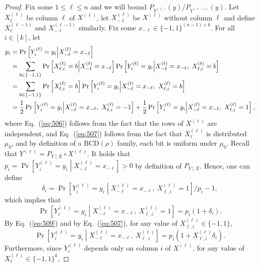 \documentclass[final, 12pt]{colt2018}
\providecommand{\BCD}{\mathrm{BCD}}
\renewcommand{\eqref}[1]{Eq.~(\ref{#1})}
\begin{document}
\begin{proof}
Fix some $1 \le \ell \le n$ and we will bound $P_{Y^{(\ell)}}(y) / P_{Y^{(\ell-1)}}(y)$. Let $X^{(\ell)}_\ell$ be column $\ell$ of $X^{(\ell)}$, let $X_{-\ell}^{(\ell)}$ be $X^{(\ell)}$ without column $\ell$ and define $X^{(\ell-1)}_\ell$ and $X^{(\ell-1)}_{-\ell}$ similarly. 
Fix some $x_{-\ell} \in \{-1,1\}^{(n-1) \times k}$. For all $i \in [k]$, let 
\begin{align}
p_i 
&= \Pr\left[Y^{(\ell)}_i = y_i \middle| X^{(\ell)}_{-\ell} = x_{-\ell}\right] \notag \\
&= \sum_{b\in\{-1,1\}} \Pr\left[X^{(\ell)}_{\ell,i} = b \middle| X^{(\ell)}_{-\ell} = x_{-\ell} \right] 
\Pr\left[Y^{(\ell)}_i = y_i \middle| X^{(\ell)}_{-\ell} = x_{-\ell},\ X^{(\ell)}_{\ell,i} = b \right] \notag \\
&= \sum_{b\in\{-1,1\}} \Pr\left[X^{(\ell)}_{\ell,i} = b \right] 
\Pr\left[Y^{(\ell)}_i = y_i \middle| X^{(\ell)}_{-\ell} = x_{-\ell},\ X^{(\ell)}_{\ell,i} = b \right] \label{eq:506} \\
&= \frac{1}{2} \Pr\left[Y^{(\ell)}_i = y_i \middle| X^{(\ell)}_{-\ell} = x_{-\ell},\ X^{(\ell)}_{\ell,i} = -1 \right]
+ \frac{1}{2} \Pr\left[Y^{(\ell)}_i = y_i \middle| X^{(\ell)}_{-\ell} = x_{-\ell},\ X^{(\ell)}_{\ell,i} = 1 \right], \label{eq:507}
\end{align}
where \eqref{eq:506} follows from the fact that the rows of $X^{(\ell)}$ are independent, and \eqref{eq:507} follows from the fact that $X^{(\ell)}_\ell$ is distributed $\mu_0$, and by definition of a $\BCD(\rho)$ family, each bit is uniform under $\mu_0$. Recall that $Y^{(\ell)} = P_{Y\mid X} \circ X^{(\ell)}$. It holds that $p_i = \Pr\left[Y^{(\ell)}_i = y_i \middle| X^{(\ell)}_{-\ell} = x_{-\ell}\right]>0$ by definition of $P_{Y\mid X}$. Hence, one can define
\[ \delta_i = \Pr\left[Y^{(\ell)}_i = y_i \middle| X^{(\ell)}_{-\ell} = x_{-\ell},\ X^{(\ell)}_{\ell,i} = 1 \right] / p_i - 1, \]
which implies that
\begin{equation} \label{eq:509}
\Pr\left[Y^{(\ell)}_i = y_i \middle| X^{(\ell)}_{-\ell} = x_{-\ell},\ X^{(\ell)}_{\ell,i} = 1 \right]
= p_i\left(1 + \delta_i \right).
\end{equation}
By \eqref{eq:509} and by \eqref{eq:507}, for any value of $X^{(\ell)}_{\ell,i} \in \{-1,1\}$,
\begin{equation} \label{eq:510}
\Pr\left[Y^{(\ell)}_i = y_i \middle| X^{(\ell)}_{-\ell} = x_{-\ell},\ X^{(\ell)}_{\ell,i} \right]
= p_i\left(1 + X_{\ell,i}^{(\ell)} \delta_i \right).
\end{equation}
Furthermore, since $Y^{(\ell)}_i$ depends only on column $i$ of $X^{(\ell)}$, for any value of $X^{(\ell)}_\ell \in \{-1,1\}^k$,

\end{proof}
\end{document}
